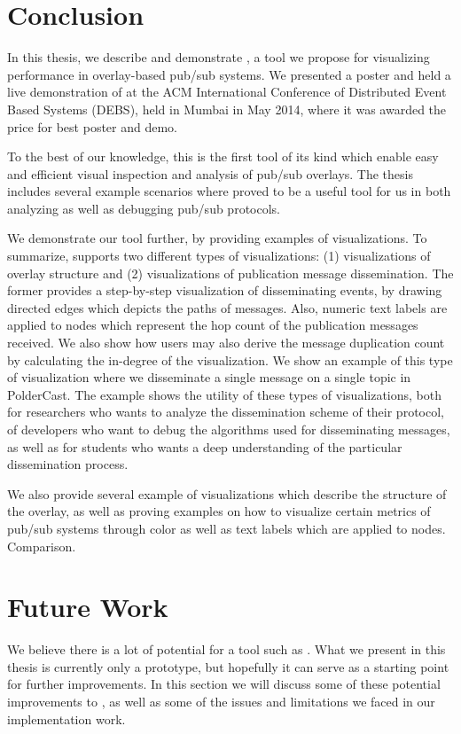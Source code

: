 \section{Conclusion}

In this thesis, we describe and demonstrate \demo{}, a tool we propose
for visualizing performance in overlay-based pub/sub systems. We
presented a poster and held a live demonstration of \demo{} at the ACM
International Conference of Distributed Event Based Systems (DEBS), held
in Mumbai in May 2014, where it was awarded the price for best poster
and demo.

To the best of our knowledge, this is the first tool of its kind which
enable easy and efficient visual inspection and analysis of pub/sub
overlays. The thesis includes several example scenarios where \demo{}
proved to be a useful tool for us in both analyzing as well as debugging
pub/sub protocols.

We demonstrate our tool further, by providing examples of
visualizations. To summarize, \demo{} supports two different types of
visualizations: (1) visualizations of overlay structure and (2)
visualizations of publication message dissemination. The former provides
a step-by-step visualization of disseminating events, by drawing
directed edges which depicts the paths of messages. Also, numeric text
labels are applied to nodes which represent the hop count of the
publication messages received. We also show how users may also derive
the message duplication count by calculating the in-degree of the
visualization. We show an example of this type of visualization where we
disseminate a single message on a single topic in PolderCast. The
example shows the utility of these types of visualizations, both for
researchers who wants to analyze the dissemination scheme of their
protocol, of developers who want to debug the algorithms used for
disseminating messages, as well as for students who wants a deep
understanding of the particular dissemination process.

We also provide several example of visualizations which describe the
structure of the overlay, as well as proving examples on how to
visualize certain metrics of pub/sub systems through color as well as
text labels which are applied to nodes. Comparison.

\section{Future Work}

We believe there is a lot of potential for a tool such as \demo{}. What
we present in this thesis is currently only a prototype, but hopefully
it can serve as a starting point for further improvements. In this
section we will discuss some of these potential improvements to \demo{},
as well as some of the issues and limitations we faced in our implementation work.

